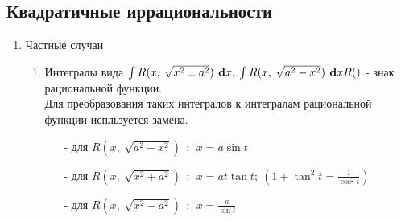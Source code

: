 \documentclass[a4paper,12pt, centered]{bookest}
\theoremstyle{remark}
\newcommand\dx{\textbf{ d}x}
\begin{document}
\subsection{Квадратичные иррациональности}
\begin{enumerate}
	\item Частные случаи \begin{enumerate} 
	\item Интегралы вида $\int R(x,\>\sqrt{x^2\pm a^2})\dx,\>\int R(x,\>\sqrt{a^2-x^2})\dx\\ R()$ - знак рациональной функции. \\
		Для преобразования таких интегралов к интегралам рациональной функции испльзуется замена.\begin{itemize}
			\item [-] для $R(x,\>\sqrt{a^2-x^2})\>\>:\>\>x=a\sin t$ 
			\item [-] для $R(x,\>\sqrt{x^2+ a^2})\>\>:\>\>x=at\tan t;\>(1+\tan^2t=\frac{1}{\cos^2t})$
			\item [-] для $R(x,\>\sqrt{x^2- a^2})\>\>:\>\>x=\frac{a}{\sin t}$


\end{itemize}
\end{enumerate}
\end{enumerate}
\end{document}
